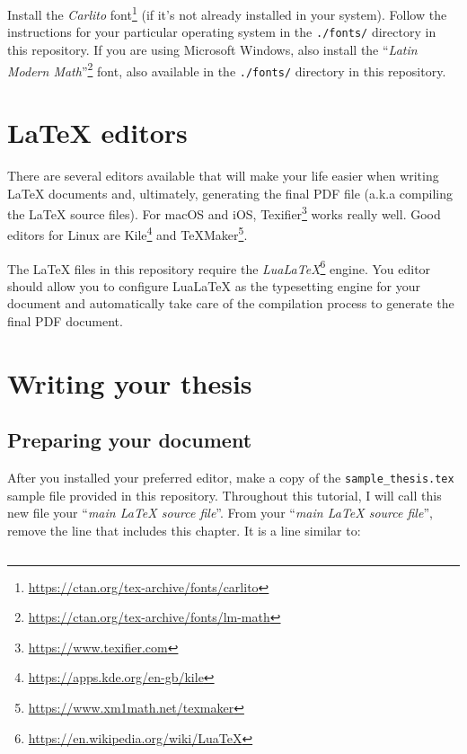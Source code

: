 Install the \textit{Carlito} font\footnote{\url{https://ctan.org/tex-archive/fonts/carlito}} (if it's not already installed in your system). Follow the instructions for your particular operating system in the \verb|./fonts/| directory in this repository. If you are using Microsoft Windows, also install the ``\textit{Latin Modern Math}''\footnote{\url{https://ctan.org/tex-archive/fonts/lm-math}} font, also available in the \verb|./fonts/| directory in this repository.


\section{LaTeX editors}


There are several editors available that will make your life easier when writing LaTeX documents and, ultimately, generating the final PDF file (a.k.a compiling the LaTeX source files). For macOS and iOS, Texifier\footnote{\url{https://www.texifier.com}} works really well. Good editors for Linux are Kile\footnote{\url{https://apps.kde.org/en-gb/kile}} and TeXMaker\footnote{\url{https://www.xm1math.net/texmaker}}.

The LaTeX files in this repository require the \textit{LuaLaTeX}\footnote{\url{https://en.wikipedia.org/wiki/LuaTeX}} engine. You editor should allow you to configure LuaLaTeX as the typesetting engine for your document and automatically take care of the compilation process to generate the final PDF document.


\section{Writing your thesis}


\subsection{Preparing your document}

After you installed your preferred \latex editor, make a copy of the \verb|sample_thesis.tex| sample file provided in this repository. Throughout this tutorial, I will call this new file your ``\textit{main LaTeX source file}''. From your ``\textit{main LaTeX source file}'', remove the line that includes this chapter. It is a line similar to:


\begin{lstlisting}[style=custom-latex]

\end{lstlisting}


